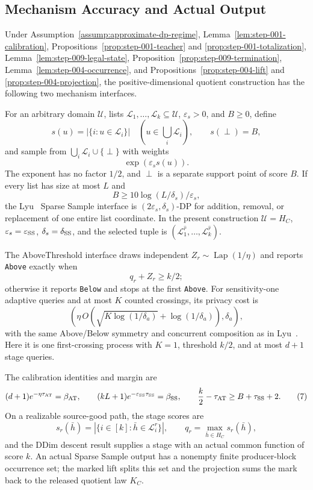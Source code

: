 \subsection{Mechanism Accuracy and Actual Output}\label{app:step_010}


\begin{proposition}\label{prop:step-010-interfaces}
Under Assumption~\ref{assump:approximate-dp-regime},
Lemma~\ref{lem:step-001-calibration},
Propositions~\ref{prop:step-001-teacher} and
\ref{prop:step-001-totalization},
Lemma~\ref{lem:step-009-legal-state},
Proposition~\ref{prop:step-009-termination},
Lemma~\ref{lem:step-004-occurrence}, and
Propositions~\ref{prop:step-004-lift} and
\ref{prop:step-004-projection}, the positive-dimensional quotient
construction has the following two mechanism interfaces.

For an arbitrary domain \(\mathcal U\), lists
\(\mathcal L_1,\ldots,\mathcal L_k\subseteq\mathcal U\),
\(\varepsilon_s>0\), and \(B\ge0\), define
\[
 s(u)=|\{i:u\in\mathcal L_i\}|\quad
 (u\in\textstyle\bigcup_i\mathcal L_i),
 \qquad s(\perp)=B,
\]
and sample from \(\bigcup_i\mathcal L_i\cup\{\perp\}\) with weights
\[
 \exp(\varepsilon_s s(u)).
 \tag{5}
\]
The exponent has no factor \(1/2\), and \(\perp\) is a separate support
point of score \(B\).  If every list has size at most \(L\) and
\[
 B\geq10\log(L/\delta_s)/\varepsilon_s,
\]
the Lyu~\citep{lyu2025} Sparse Sample interface is
\((2\varepsilon_s,\delta_s)\)-DP for addition, removal, or replacement of
one entire list coordinate.  In the present construction
\(\mathcal U=H_C\), \(\varepsilon_s=\varepsilon_{\rm SS}\),
\(\delta_s=\delta_{\rm SS}\), and the selected tuple is
\((\mathcal L_1^{\widehat r},\ldots,\mathcal L_k^{\widehat r})\).

The AboveThreshold interface draws independent
\(Z_r\sim\operatorname{Lap}(1/\eta)\) and reports \texttt{Above} exactly
when
\[
 q_r+Z_r\geq k/2;
 \tag{6}
\]
otherwise it reports \texttt{Below} and stops at the first \texttt{Above}.
For sensitivity-one adaptive queries and at most \(K\) counted crossings,
its privacy cost is
\[
 \left(\eta\,O(\sqrt{K\log(1/\delta_a)}+\log(1/\delta_a)),
 \delta_a\right),
\]
with the same Above/Below symmetry and concurrent composition as in
Lyu~\citep{lyu2025}.  Here it is one first-crossing process with \(K=1\),
threshold \(k/2\), and at most \(d+1\) stage queries.

The calibration identities and margin are
\[
 (d+1)e^{-\eta\tau_{\rm AT}}=\beta_{\rm AT},
 \qquad
 (kL+1)e^{-\varepsilon_{\rm SS}\tau_{\rm SS}}=\beta_{\rm SS},
 \qquad
 \frac{k}{2}-\tau_{\rm AT}\geq B+\tau_{\rm SS}+2.
 \tag{7}
\]
On a realizable source-good path, the stage scores are
\[
 s_r(\bar h)=|\{i\in[k]:\bar h\in\mathcal L_i^r\}|,
 \qquad q_r=\max_{\bar h\in H_C}s_r(\bar h),
\]
and the DDim descent result supplies a stage with an actual common
function of score \(k\).  An actual Sparse Sample output has a nonempty
finite producer-block occurrence set; the marked lift splits this set and
the projection sums the mark back to the released quotient law \(K_C\).
\end{proposition}

